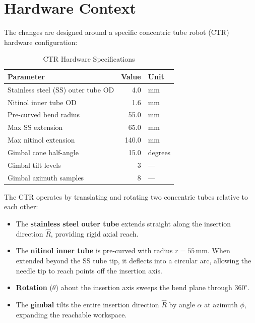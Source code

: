 \documentclass[11pt,a4paper]{article}
\begin{document}
\section{Hardware Context}

The changes are designed around a specific concentric tube robot (CTR) hardware configuration:

\begin{table}[H]
\centering
\caption{CTR Hardware Specifications}
\begin{tabular}{lrl}
\toprule
\textbf{Parameter} & \textbf{Value} & \textbf{Unit} \\
\midrule
Stainless steel (SS) outer tube OD & 4.0 & mm \\
Nitinol inner tube OD & 1.6 & mm \\
Pre-curved bend radius & 55.0 & mm \\
Max SS extension & 65.0 & mm \\
Max nitinol extension & 140.0 & mm \\
Gimbal cone half-angle & 15.0 & degrees \\
Gimbal tilt levels & 3 & --- \\
Gimbal azimuth samples & 8 & --- \\
\bottomrule
\end{tabular}
\end{table}

\noindent The CTR operates by translating and rotating two concentric tubes relative to each other:
\begin{itemize}[nosep]
    \item The \textbf{stainless steel outer tube} extends straight along the insertion direction $\hat{R}$, providing rigid axial reach.
    \item The \textbf{nitinol inner tube} is pre-curved with radius $r = 55$\,mm. When extended beyond the SS tube tip, it deflects into a circular arc, allowing the needle tip to reach points off the insertion axis.
    \item \textbf{Rotation} ($\theta$) about the insertion axis sweeps the bend plane through $360^\circ$.
    \item The \textbf{gimbal} tilts the entire insertion direction $\hat{R}$ by angle $\alpha$ at azimuth $\phi$, expanding the reachable workspace.
\end{itemize}
\end{document}
